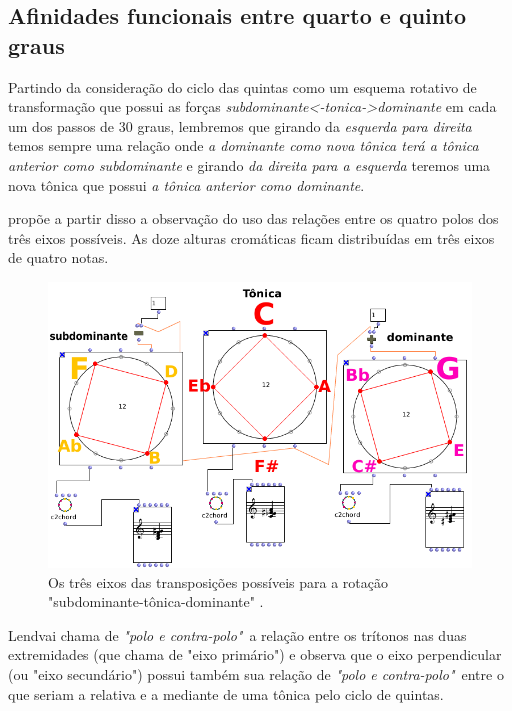 \documentclass[
	12pt,				%
	openright,			%
	twoside,			%
	a4paper,			%
	english,			%
	french,				%
	spanish,			%
	brazil				%
	]{abntex2}
\begin{document}
\subsection{Afinidades funcionais entre quarto e quinto graus}

Partindo da consideração do ciclo das quintas como um esquema rotativo de transformação que possui as forças \textit{subdominante<-tonica->dominante} em cada um dos passos de 30 graus, lembremos que girando da \textit{esquerda para direita} temos sempre uma relação onde \textit{a dominante como nova tônica terá a tônica anterior como subdominante} e girando \textit{da direita para a esquerda} teremos uma nova tônica que possui \textit{a tônica anterior como dominante}. 

 propõe a partir disso a observação do uso das relações entre os quatro polos dos três eixos possíveis. As doze alturas cromáticas ficam distribuídas em três eixos de quatro notas. 

\begin{figure}[!h]
	\caption{\label{fig_grafico}Os três eixos das transposições possíveis para a rotação "subdominante-tônica-dominante" .}
	\begin{center}
	    \includegraphics[scale=0.45]{axis/axisOM.png}
	\end{center}
\end{figure}


Lendvai chama de \textit{"polo e contra-polo"}\ a relação entre os trítonos nas duas extremidades (que chama de "eixo primário") e observa que o eixo perpendicular (ou "eixo secundário") possui também sua relação de \textit{"polo e contra-polo"}\ entre o que seriam a relativa e a mediante de uma tônica pelo ciclo de quintas. 
\end{document}
